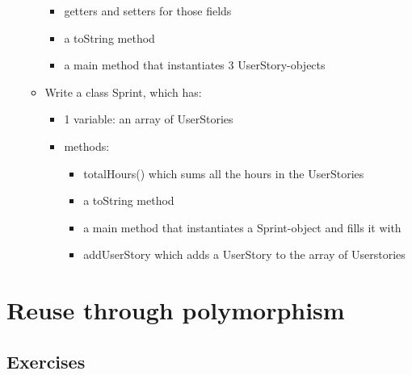 \begin{enumerate}
\begin{itemize}
\begin{itemize}
                        \item getters and setters for those fields
                        \item a toString method
                        \item a main method that instantiates 3 UserStory-objects
                    \end{itemize}

                    \item Write a class Sprint, which has:
                         \begin{itemize}
                            \item 1 variable: an array of UserStories
                            \item methods:
                            \begin{itemize}
                                \item totalHours() which sums all the hours in the UserStories
                                \item a toString method
                                \item a main method that instantiates a Sprint-object and fills it with
                                \item addUserStory which adds a UserStory to the array of Userstories
                        \end{itemize}
                    \end{itemize}
                \end{itemize}
    \end{enumerate}

\chapter{Reuse through polymorphism}


    \section{Exercises}
